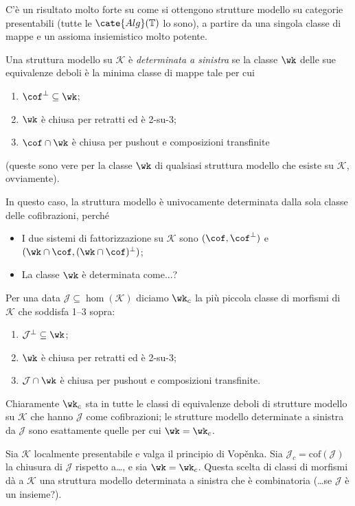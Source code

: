 \documentclass[12pt]{amsart}
\def\J{\mathcal{J}}
\def\Alg{\cate{Alg}}
\def\T{\mathbb{T}}
\def\K{\mathcal K}
\begin{document}
C'è un risultato molto forte su come si ottengono strutture modello su categorie presentabili (tutte le $\Alg(\T)$ lo sono), a partire da una singola classe di mappe e un assioma insiemistico molto potente. 
\begin{definition}
Una struttura modello su $\K$ è \emph{determinata a sinistra} se la classe $\wk$ delle sue equivalenze deboli è la minima classe di mappe tale per cui
\begin{enumerate}
	\item $\cof^\perp \subseteq \wk$;
	\item $\wk$ è chiusa per retratti ed è 2-su-3;
	\item $\cof\cap \wk$ è chiusa per pushout e composizioni transfinite
\end{enumerate}
(queste sono vere per la classe $\wk$ di qualsiasi struttura modello che esiste su $\K$, ovviamente).
\end{definition}
In questo caso, la struttura modello è univocamente determinata dalla sola classe delle cofibrazioni, perché
\begin{itemize}
	\item I due sistemi di fattorizzazione su $\K$ sono $(\cof, \cof^\perp)$ e $(\wk\cap\cof, (\wk\cap\cof)^\perp)$;
	\item La classe $\wk$ è determinata come...?
\end{itemize}
\begin{definition}
Per una data $\J\subseteq \hom(\K)$ diciamo $\wk_c$ la più piccola classe di morfismi di $\K$ che soddisfa 1--3 sopra:
\begin{enumerate}
	\item $\J^\perp \subseteq \wk$;
	\item $\wk$ è chiusa per retratti ed è 2-su-3;
	\item $\J\cap \wk$ è chiusa per pushout e composizioni transfinite.
\end{enumerate}
\end{definition}
Chiaramente $\wk_c$ sta in tutte le classi di equivalenze deboli di strutture modello su $\K$ che hanno $\J$ come cofibrazioni; le strutture modello determinate a sinistra da $\J$ sono esattamente quelle per cui $\wk = \wk_c$.
\begin{theorem}\label{fico}
Sia $\K$ localmente presentabile e valga il principio di Vop\v{e}nka. Sia $\J_c = \text{cof}(\J)$ la chiusura di $\J$ rispetto a\dots, e sia $\wk = \wk_c$. Questa scelta di classi di morfismi dà a $\K$ una struttura modello determinata a sinistra che è combinatoria (\dots se $\J$ è un insieme?).
\end{theorem}
\end{document}

